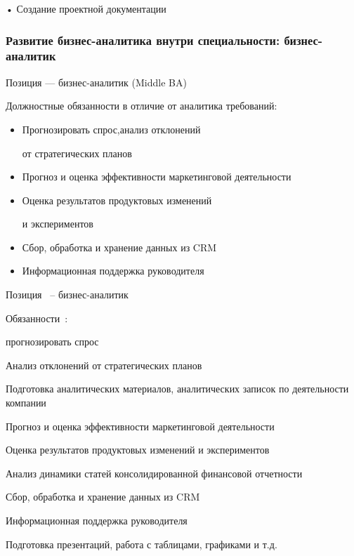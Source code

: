 \documentclass{../industrial-development}
\begin{document}
•	Создание проектной документации


\begin{frame} \frametitle{Развитие бизнес-аналитика внутри специальности: бизнес-аналитик}
  \begin{block}{}
  \alert{Позиция --- бизнес-аналитик (Middle  BA) }

Должностные обязанности в отличие от аналитика требований: 
  \end{block}
  \begin{itemize}
  \item  Прогнозировать спрос,анализ отклонений 

от стратегических планов
  \item  Прогноз и оценка эффективности маркетинговой деятельности
  \item Оценка результатов продуктовых изменений 

и экспериментов
 \item  Сбор, обработка и хранение данных из CRM
 \item  Информационная поддержка руководителя
  \end{itemize}
\end{frame}


\lecturenotes

Позиция~\cite{hh} –  бизнес-аналитик~\cite{itcf}

Обязанности~\cite{rab}:

	прогнозировать спрос 

Анализ отклонений от стратегических планов

Подготовка аналитических материалов, аналитических записок по деятельности компании

 Прогноз и оценка эффективности маркетинговой деятельности

Оценка результатов продуктовых изменений и экспериментов

Анализ динамики статей консолидированной финансовой отчетности

Сбор, обработка и хранение данных из CRM

 Информационная поддержка руководителя

 Подготовка презентаций, работа с таблицами, графиками и т.д.
\end{document}
